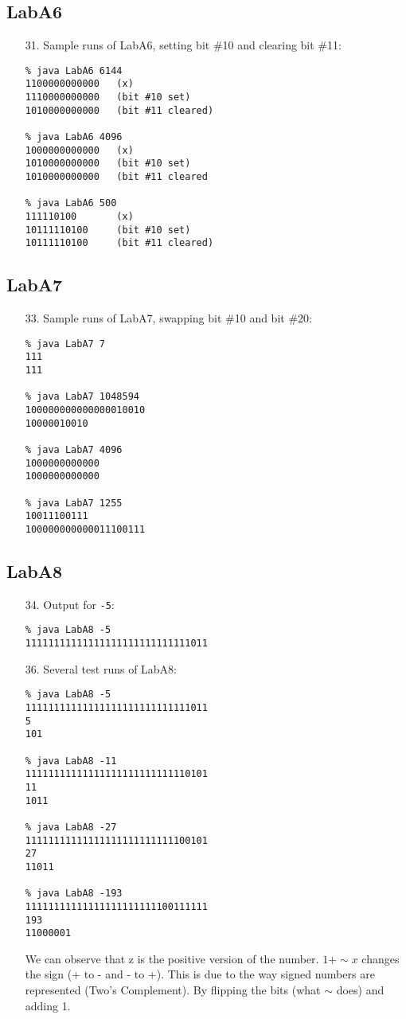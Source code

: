 \documentclass{article}
\begin{document}
\subsection{LabA6}
\begin{enumerate}
\item[31. ] Sample runs of LabA6, setting bit \#10 and clearing bit \#11:
\begin{verbatim}
% java LabA6 6144
1100000000000   (x)
1110000000000   (bit #10 set)
1010000000000   (bit #11 cleared)

% java LabA6 4096
1000000000000   (x)
1010000000000   (bit #10 set)
1010000000000   (bit #11 cleared

% java LabA6 500
111110100       (x)
10111110100     (bit #10 set)
10111110100     (bit #11 cleared)
\end{verbatim}
\end{enumerate}

\subsection{LabA7}
\begin{enumerate}
\item[33. ] Sample runs of LabA7, swapping bit \#10 and bit \#20:
\begin{verbatim}
% java LabA7 7
111
111

% java LabA7 1048594
100000000000000010010
10000010010

% java LabA7 4096
1000000000000
1000000000000

% java LabA7 1255
10011100111
100000000000011100111
\end{verbatim}
\end{enumerate}

\subsection{LabA8}
\begin{enumerate}

\item[34. ] Output for \verb$-5$:
\begin{verbatim}
% java LabA8 -5
11111111111111111111111111111011
\end{verbatim}

\item[36. ] Several test runs of LabA8:

\begin{verbatim}
% java LabA8 -5
11111111111111111111111111111011
5
101

% java LabA8 -11
11111111111111111111111111110101
11
1011

% java LabA8 -27
11111111111111111111111111100101
27
11011

% java LabA8 -193
11111111111111111111111100111111
193
11000001
\end{verbatim}
We can observe that z is the positive version of the number. $1 + \sim x$ changes the sign (+ to - and - to +). This is due to the way signed numbers are represented (Two's Complement). By flipping the bits (what $\sim$ does) and adding 1.
\end{enumerate}
\end{document}
